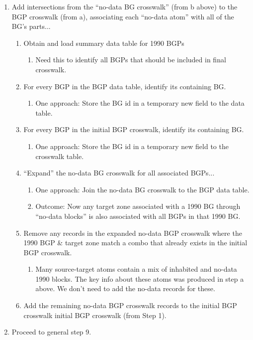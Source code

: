 \documentclass{article}
\begin{document}
\begin{enumerate}
\item Add intersections from the ``no-data BG crosswalk'' (from b above) to the BGP crosswalk (from a), associating each ``no-data atom'' with all of the BG's parts...
    \begin{enumerate}
    \item Obtain and load summary data table for 1990 BGPs
        \begin{enumerate}
        \item Need this to identify all BGPs that should be included in final crosswalk.
        \end{enumerate}
    \item For every BGP in the BGP data table, identify its containing BG.
        \begin{enumerate}
        \item One approach: Store the BG id in a temporary new field to the data table.
        \end{enumerate}
    \item For every BGP in the initial BGP crosswalk, identify its containing BG.
        \begin{enumerate}
        \item One approach: Store the BG id in a temporary new field to the crosswalk table.
        \end{enumerate}
    \item ``Expand'' the no-data BG crosswalk for all associated BGPs...
        \begin{enumerate}
        \item One approach: Join the no-data BG crosswalk to the BGP data table.
        \item Outcome: Now any target zone associated with a 1990 BG through ``no-data blocks'' is also associated with all BGPs in that 1990 BG.
        \end{enumerate}
    \item Remove any records in the expanded no-data BGP crosswalk where the 1990 BGP \& target zone match a combo that already exists in the initial BGP crosswalk.
        \begin{enumerate}
        \item Many source-target atoms contain a mix of inhabited and no-data 1990 blocks. The key info about these atoms was produced in step a above. We don't need to add the no-data records for these.
        \end{enumerate}
    \item Add the remaining no-data BGP crosswalk records to the initial BGP crosswalk initial BGP crosswalk (from Step 1).
    
    \end{enumerate}

\item Proceed to general step 9.

\end{enumerate}
\end{document}
